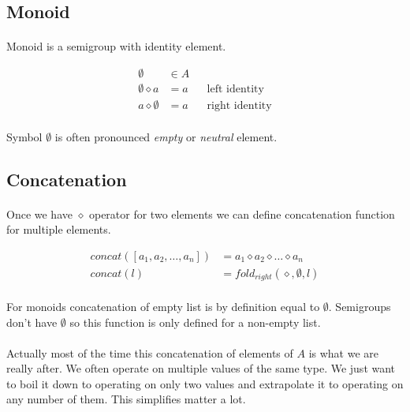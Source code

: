 \documentclass{article}
\begin{document}
\subsection{Monoid}

    \paragraph{}
    Monoid is a semigroup with identity element.

    \begin{align*}
        \emptyset &\in A \\
        \emptyset \diamond a &= a && \text{left  identity} \\
        a \diamond \emptyset &= a && \text{right identity} 
    \end{align*}

    \paragraph{}
    Symbol $\emptyset$ is often pronounced \textit{empty} or \textit{neutral} element.

\subsection{Concatenation}

    \paragraph{}
    Once we have $\diamond$ operator for two elements we can define concatenation function for multiple elements.

    \begin{align*}
        concat([a_1, a_2, \dots, a_n]) &= a_1 \diamond a_2 \diamond \dots \diamond a_n \\
        concat(l) &= fold_{right}(\diamond, \emptyset, l)
    \end{align*}

    \paragraph{}
    For monoids concatenation of empty list is by definition equal to $\emptyset$.
    Semigroups don't have $\emptyset$ so this function is only defined for a non-empty list.

    \paragraph{}
    Actually most of the time this concatenation of elements of $A$ is what we are really after. We often operate on multiple values of the same type. We just want to boil it down to operating on only two values and extrapolate it to operating on any number of them. This simplifies matter a lot.
\end{document}
